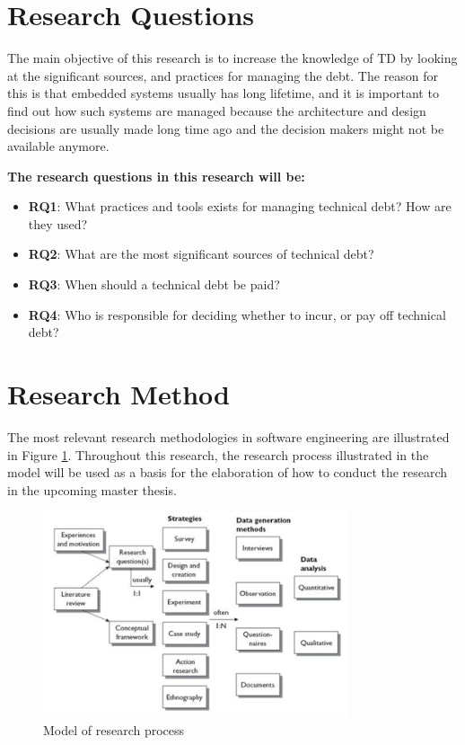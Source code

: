 \section{Research Questions}
The main objective of this research is to increase the knowledge of TD by looking at the significant sources, and practices for managing the debt. The reason for this is that embedded systems usually has long lifetime, and it is important to find out how such systems are managed because the architecture and design decisions are usually made long time ago and the decision makers might not be available anymore. 

\textbf{The research questions in this research will be:} 
\begin{itemize}
	\item \textbf{RQ1}: What practices and tools exists for managing technical debt? How are they used?
	\item \textbf{RQ2}: What are the most significant sources of technical debt?
	\item \textbf{RQ3}: When should a technical debt be paid?
	\item \textbf{RQ4}: Who is responsible for deciding whether to incur, or pay off technical debt?
\end{itemize}

\section{Research Method}
The most relevant research methodologies in software engineering are illustrated in Figure \ref{fig:researchProcess}. Throughout this research, the research process illustrated in the model will be used as a basis for the elaboration of how to conduct the research in the upcoming master thesis. 

\begin{figure}[H]
	\centering
	\includegraphics[width=0.8\textwidth]{images/researchStrategies.png}
	\caption{Model of research process\cite{Oates:2006:RIS:1202299}}
	\label{fig:researchProcess}
\end{figure}

